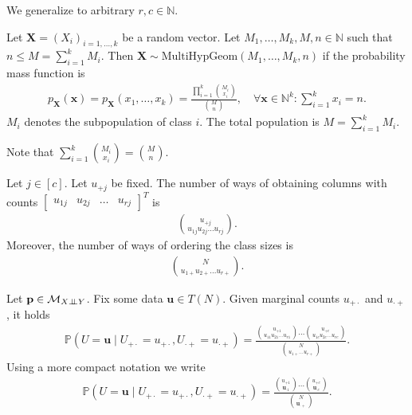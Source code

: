 We generalize to arbitrary \( r,c \in \mathbb{N} \).

\begin{defi}
  Let \( \mathbf{X} =(X_i)_{i=1,\dots, k} \) be a random vector. Let \( M_1, \dots, M_k, M, n \in \mathbb{N} \) such that \( n \leq M = \sum_{i=1}^k M_i \). Then \( \mathbf{X} \sim \mathrm{MultiHypGeom}(M_1, \dots, M_k, n) \) if the probability mass function is 
  \begin{align*}
    p_\mathbf X(\mathbf{x}) = p_\mathbf X(x_1, \dots, x_k) = \frac{\prod^k_{i=1} {M_i \choose x_i}}{{M \choose n}},  \quad \forall  \mathbf x \in \mathbb{N}^k: \sum_{i=1}^k  x_i = n.
  \end{align*}
  \( M_i \) denotes the subpopulation of class \( i \). The total population is \( M = \sum^k_{i=1} M_i \).
\end{defi}

\begin{remark}
  Note that \( \sum_{i=1}^k {M_i \choose x_i} = {M \choose n} \).
\end{remark}

\begin{prop}
  Let \( j \in [c] \). Let \(  u_{+j} \) be fixed. The number of ways of obtaining columns with counts \( \begin{bmatrix}
    u_{1j} & u_{2j} & \dots & u_{rj}
  \end{bmatrix}^T \) 
  is 
  \begin{align*}
    {u_{+j} \choose u_{1j}u_{2j} \dots u_{rj}}.
  \end{align*}
  Moreover, the number of ways of ordering the class sizes is 
  \begin{align*}
    {N \choose u_{1+} u_{2+} ... u_{r+}}.
  \end{align*}
\end{prop}

\begin{mdframed}  
\begin{thm}
  Let \( \mathbf p \in \mathcal{M}_{X \perp \!\!\! \perp Y} \). Fix some data \( \mathbf{u} \in T(N) \). Given marginal counts \( u_{+\cdot} \) and \( u_{\cdot +} \), it holds 
  \begin{align*}
    \mathbb{P}(U = \mathbf u \mid U_{+\cdot} = u_{+ \cdot}, U_{\cdot+} = u_{\cdot +}) = \frac{{u_{+1} \choose u_{11}u_{21} \dots u_{r1}} \dots {u_{+c} \choose u_{1c}u_{2c} \dots u_{rc}}}{{N \choose u_{1+}\dots u_{r+}}}.
  \end{align*}
  Using a more compact notation we write 
  \begin{align*}
    \mathbb{P}(U = \mathbf u \mid U_{+\cdot} = u_{+ \cdot}, U_{\cdot+} = u_{\cdot +}) = \frac{{u_{+1} \choose \mathbf{u}_{\cdot 1}} \dots {u_{+c} \choose \mathbf{u}_{\cdot c}}}{{N \choose \mathbf{u}_{\cdot +}}}.
  \end{align*}
\end{thm}
\end{mdframed}

